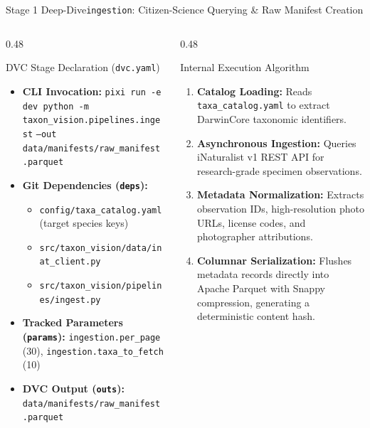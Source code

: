 \begin{frame}{Stage 1 Deep-Dive}{\texttt{ingestion}: Citizen-Science Querying \& Raw Manifest Creation}
\begin{columns}[T]
\begin{column}{0.48\textwidth}
            \begin{block}{DVC Stage Declaration (\texttt{dvc.yaml})}
                \begin{itemize}\scriptsize
                    \item \textbf{CLI Invocation:}
                        \texttt{pixi run -e dev python -m} \newline
                        \texttt{taxon\_vision.pipelines.ingest} \newline
                        \texttt{--out data/manifests/raw\_manifest.parquet}
                    \item \textbf{Git Dependencies (\texttt{deps}):}
                        \begin{itemize}\tiny
                            \item \texttt{config/taxa\_catalog.yaml} (target species keys)
                            \item \texttt{src/taxon\_vision/data/inat\_client.py}
                            \item \texttt{src/taxon\_vision/pipelines/ingest.py}
                        \end{itemize}
                    \item \textbf{Tracked Parameters (\texttt{params}):}
                        \texttt{ingestion.per\_page} (30), \newline
                        \texttt{ingestion.taxa\_to\_fetch} (10)
                    \item \textbf{DVC Output (\texttt{outs}):}
                        \texttt{data/manifests/raw\_manifest.parquet}
                \end{itemize}
            \end{block}
        \end{column}
        \begin{column}{0.48\textwidth}
            \begin{block}{Internal Execution Algorithm}
                \begin{enumerate}\scriptsize
                    \item \textbf{Catalog Loading:} Reads \texttt{taxa\_catalog.yaml} to extract DarwinCore taxonomic identifiers.
                    \item \textbf{Asynchronous Ingestion:} Queries iNaturalist v1 REST API for research-grade specimen observations.
                    \item \textbf{Metadata Normalization:} Extracts observation IDs, high-resolution photo URLs, license codes, and photographer attributions.
                    \item \textbf{Columnar Serialization:} Flushes metadata records directly into Apache Parquet with Snappy compression, generating a deterministic content hash.
                \end{enumerate}
            \end{block}
        \end{column}
    \end{columns}



\end{frame}
